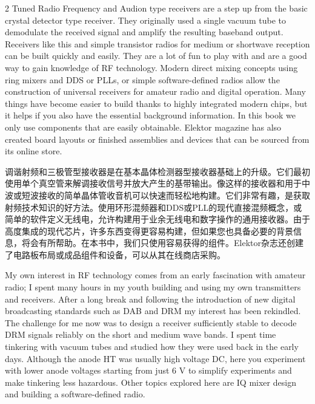 \documentclass{ctexbook}
\begin{document}
\begin{paracol}{2}
Tuned Radio Frequency and Audion type receivers are a step up from the basic crystal detector type receiver. They originally used a single vacuum tube to demodulate the received 
signal and amplify the resulting baseband output. Receivers like this and simple transistor 
radios for medium or shortwave reception can be built quickly and easily. They are a lot 
of fun to play with and are a good way to gain knowledge of RF technology. Modern direct 
mixing concepts using ring mixers and DDS or PLLs, or simple software-defined radios allow 
the construction of universal receivers for amateur radio and digital operation. Many things 
have become easier to build thanks to highly integrated modern chips, but it helps if you 
also have the essential background information. In this book we only use components that 
are easily obtainable. Elektor magazine has also created board layouts or finished assemblies and devices that can be sourced from its online store. 

\switchcolumn

调谐射频和三极管型接收器是在基本晶体检测器型接收器基础上的升级。它们最初使用单个真空管来解调接收信号并放大产生的基带输出。像这样的接收器和用于中波或短波接收的简单晶体管收音机可以快速而轻松地构建。它们非常有趣，是获取射频技术知识的好方法。使用环形混频器和DDS或PLL的现代直接混频概念，或简单的软件定义无线电，允许构建用于业余无线电和数字操作的通用接收器。由于高度集成的现代芯片，许多东西变得更容易构建，但如果您也具备必要的背景信息，将会有所帮助。在本书中，我们只使用容易获得的组件。Elektor杂志还创建了电路板布局或成品组件和设备，可以从其在线商店采购。

\switchcolumn*

My own interest in RF technology comes from an early fascination with amateur radio; I 
spent many hours in my youth building and using my own transmitters and receivers. After 
a long break and following the introduction of new digital broadcasting standards such as 
DAB and DRM my interest has been rekindled. The challenge for me now was to design a 
receiver sufficiently stable to decode DRM signals reliably on the short and medium wave 
bands. I spent time tinkering with vacuum tubes and studied how they were used back 
in the early days. Although the anode HT was usually high voltage DC, here you experiment with lower anode voltages starting from just 6 V to simplify experiments and make 
tinkering less hazardous. Other topics explored here are IQ mixer design and building a 
software-defined radio. 

\switchcolumn


\end{paracol}
\end{document}
